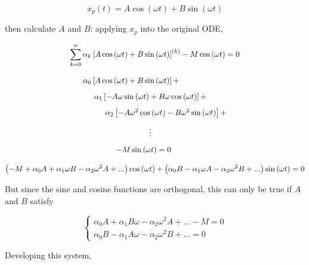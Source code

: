 \begin{equation} x_p(t) = A\cos\left(\omega t\right) + B\sin\left(\omega t\right) \end{equation}

	then calculate $A$ and $B$: applying $x_p$ into the original ODE,

\begin{gather}
	\sum\limits_{k=0}^n \alpha_k\left[A\cos\left(\omega t\right) + B\sin\left(\omega t\right)\right]^{(k)} - M\cos\left(\omega t\right) = 0 \nonumber\\[3mm]
	\left. \begin{array}{l}
		\alpha_0\left[A\cos\left(\omega t\right) + B\sin\left(\omega t\right)\right] + \\[3mm]
		\hspace{5mm}\alpha_1\left[-A\omega\sin\left(\omega t\right) + B\omega\cos\left(\omega t\right)\right] + \\[3mm]
		\hspace{10mm}\alpha_2\left[-A\omega^2\cos\left(\omega t\right) - B\omega^2\sin\left(\omega t\right)\right] + \\[3mm]
		\hspace{30mm} \vdots\\[3mm]
		\hspace{15mm} - M\sin\left(\omega t\right) = 0 
	\end{array}\right.  \nonumber\\[3mm]
%
	\left(-M + \alpha_0A + \alpha_1\omega B - \alpha_2\omega^2A + ...\right)\cos\left(\omega t\right) +  \left(\alpha_0 B - \alpha_1\omega A - \alpha_2\omega^2B + ...\right)\sin\left(\omega t\right) = 0
\end{gather}

	But since the sine and cosine functions are orthogonal, this can only be true if $A$ and $B$ satisfy

\begin{equation}
\left\{\begin{array}{l}
	\alpha_0A + \alpha_1 B\omega - \alpha_2\omega^2A + ... - M = 0 \\[3mm]
	\alpha_0B - \alpha_1 A\omega - \alpha_2\omega^2B + ... = 0
\end{array}\right.
\end{equation}

	Developing this system,

